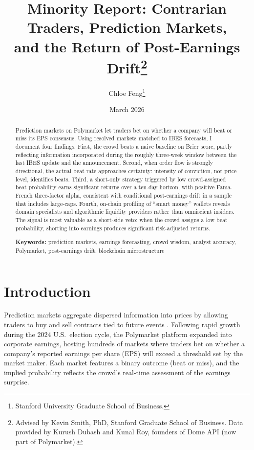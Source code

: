 \documentclass[11pt]{article}
\title{\Large \textbf{Minority Report: Contrarian Traders, Prediction Markets,\\and the Return of Post-Earnings Drift}\thanks{Advised by Kevin Smith, PhD, Stanford Graduate School of Business. Data provided by Kurush Dubash and Kunal Roy, founders of Dome API (now part of Polymarket).}}
\author{Chloe Feng\thanks{Stanford University Graduate School of Business.}}
\date{March 2026}
\begin{document}
\maketitle

\begin{abstract}
\noindent
Prediction markets on Polymarket let traders bet on whether a company will beat or miss its EPS consensus. Using resolved markets matched to IBES forecasts, I document four findings. First, the crowd beats a naive baseline on Brier score, partly reflecting information incorporated during the roughly three-week window between the last IBES update and the announcement. Second, when order flow is strongly directional, the actual beat rate approaches certainty: intensity of conviction, not price level, identifies beats. Third, a short-only strategy triggered by low crowd-assigned beat probability earns significant returns over a ten-day horizon, with positive Fama-French three-factor alpha, consistent with conditional post-earnings drift in a sample that includes large-caps. Fourth, on-chain profiling of ``smart money'' wallets reveals domain specialists and algorithmic liquidity providers rather than omniscient insiders. The signal is most valuable as a short-side veto: when the crowd assigns a low beat probability, shorting into earnings produces significant risk-adjusted returns.

\medskip
\noindent
\textbf{Keywords:} prediction markets, earnings forecasting, crowd wisdom, analyst accuracy, Polymarket, post-earnings drift, blockchain microstructure
\end{abstract}

\thispagestyle{empty}
\newpage
\setcounter{page}{1}

\section{Introduction}

Prediction markets aggregate dispersed information into prices by allowing traders to buy and sell contracts tied to future events \citep{wolfers2004prediction, arrow2008promise}. Following rapid growth during the 2024 U.S.\ election cycle, the Polymarket platform expanded into corporate earnings, hosting hundreds of markets where traders bet on whether a company's reported earnings per share (EPS) will exceed a threshold set by the market maker. Each market features a binary outcome (beat or miss), and the implied probability reflects the crowd's real-time assessment of the earnings surprise.
\end{document}
